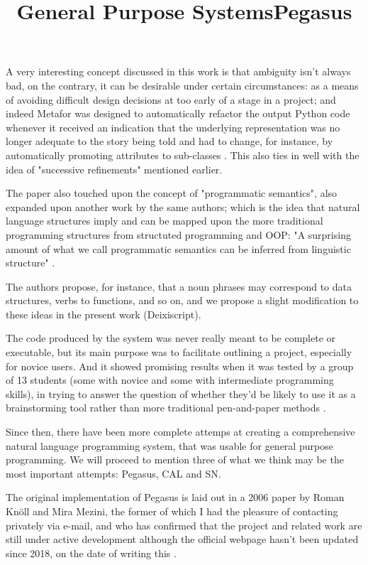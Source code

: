 A very interesting concept discussed in this work is that ambiguity isn't always bad, on the contrary, it can be desirable under certain circumstances: as a means of avoiding difficult design decisions at too early of a stage in a project; and indeed Metafor was designed to automatically refactor the output Python code whenever it received an indication that the underlying representation was no longer adequate to the story being told and had to change, for instance, by automatically promoting attributes to sub-classes \cite{liu2005metafor}. This also ties in well with the idea of "successive refinements" mentioned earlier.

The paper also touched upon the concept of "programmatic semantics", also expanded upon another work \cite{liu2005programmatic} by the same authors; which is the idea that natural language structures imply and can be mapped upon the more traditional programming structures from structuted programming and OOP: "A surprising amount of what we call programmatic semantics can be inferred from linguistic structure" \cite{liu2005metafor}.

The authors propose, for instance, that a noun phrases may correspond to data structures, verbs to functions, and so on, and we propose a slight modification to these ideas in the present work (Deixiscript).

The code produced by the system was never really meant to be complete or executable, but its main purpose was to facilitate outlining a project, especially for novice users. And it showed promising results when it was tested by a group of 13 students (some with novice and some with intermediate programming skills), in trying to answer the question of whether they'd be likely to use it as a brainstorming tool rather than more traditional pen-and-paper methods \cite{liu2005metafor}.

\title{General Purpose Systems}

Since then, there have been more complete attemps at creating a comprehensive natural language programming system, that was usable for general purpose programming. We will proceed to mention three of what we think may be the most important attempts: Pegasus, CAL and SN.

\title{Pegasus}

The original implementation of Pegasus is laid out in a 2006 paper \cite{knoll2006pegasus} by Roman Knöll and Mira Mezini, the former of which I had the pleasure of contacting privately via e-mail, and who has confirmed that the project and related work are still under active development although the official webpage hasn't been updated since 2018, on the date of writing this \cite{pegasuswebsite}.

